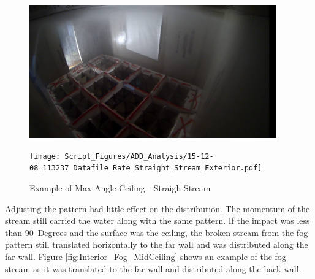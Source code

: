 \documentclass[12pt,oneside]{book}
\begin{document}
\begin{figure}[H]
	\centering
	\begin{minipage}[b]{0.45\textwidth}
	\centering
	\includegraphics[width=0.95\textwidth]{Figures/Water_Distribution/Nozzle_Directions/Exterior_MaxAngleCeiling_SS.png}
	\end{minipage}
	\begin{minipage}[b]{0.45\textwidth}
	\centering
	\texttt{[image: Script\_Figures/ADD\_Analysis/15-12-08\_113237\_Datafile\_Rate\_Straight\_Stream\_Exterior.pdf]}
	\end{minipage}
	\caption{Example of Max Angle Ceiling - Straigh Stream}
	\label{fig:MaxAngle_Exterior}
\end{figure}

Adjusting the pattern had little effect on the distribution. The momentum of the stream still carried the water along with the same pattern. If the impact was less than 90~Degrees and the surface was the ceiling, the broken stream from the fog pattern still translated horizontally to the far wall and was distributed along the far wall. Figure \ref{fig:Interior_Fog_MidCeiling} shows an example of the fog stream as it was translated to the far wall and distributed along the back wall.
\end{document}
